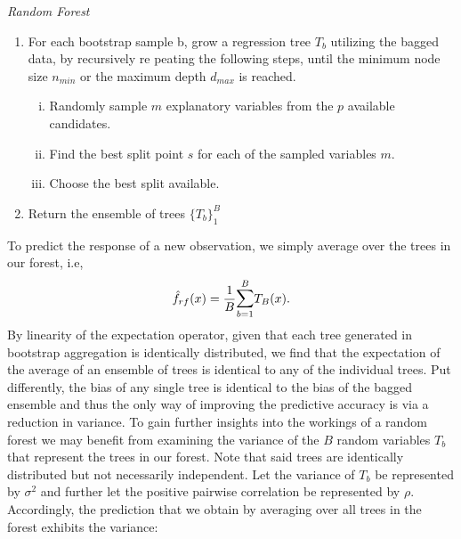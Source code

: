 \documentclass[a4paper,12pt, headsepline]{scrartcl}
\numberwithin{equation}{section}
\begin{document}

{}
{\centering
\begin{minipage}{.9\linewidth}
	\begin{algorithm}[H]
		\caption{\textit{Random Forest}}\label{alg:one}
		\begin{enumerate}
			\item For each bootstrap sample b, grow a regression tree $T_b$ utilizing the bagged data, by recursively re	peating the following steps, until the minimum node size $n_{min}$ or the maximum depth $d_{max}$ is reached.
			\begin{enumerate}[i.]
				\item Randomly sample $m$ explanatory variables from the $p$ available candidates.
				\item Find the best split point $s$ for each of the sampled variables $m$.
				\item Choose the best split available.
			\end{enumerate}
			\item Return the ensemble of trees $\{T_b\}_1^B$
		\end{enumerate}
	\end{algorithm}
\end{minipage}
\par
}
To predict the response of a new observation, we simply average over the trees in our forest, i.e,
\[
\hat f_{rf}(x) = \frac{1}{B} \mathlarger{\sum}\limits_{b = 1}^B T_B(x).
\]
 By linearity of the expectation operator, given that each tree generated in bootstrap aggregation is identically distributed, we find that the expectation of the average of an ensemble of trees is identical to any of the individual trees. Put differently, the bias of any single tree is identical to the bias of the bagged ensemble and thus the only way of improving the predictive accuracy is via a reduction in variance.
 To gain further insights into the workings of a random forest we may benefit from examining the variance of the $B$ random variables $T_b$ that represent the trees in our forest. Note that said trees are identically distributed but not necessarily independent. Let the variance of $T_b$ be represented by $\sigma^2$ and further let the positive pairwise correlation be represented by $\rho$. Accordingly, the prediction that we obtain by averaging over all trees in the forest exhibits the variance: 
\end{document}
